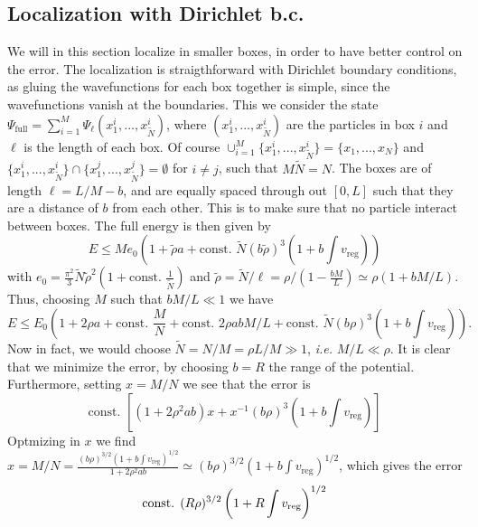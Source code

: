 \documentclass[a4paper,11pt]{article}
\newcommand{\ie}{\emph{i.e.} }
\numberwithin{equation}{section}
\begin{document}
	\subsection{Localization with Dirichlet b.c.}
	We will in this section localize in smaller boxes, in order to have better control on the error. The localization is straigthforward with Dirichlet boundary conditions, as gluing the wavefunctions for each box together is simple, since the wavefunctions vanish at the boundaries. This we consider the state $ \Psi_{\text{full}}=\sum_{i=1}^{M}\Psi_{\ell}(x^i_1,...,x^i_{\tilde{N}}) $, where $ (x_1^i,...,x_{\tilde{N}}^i) $ are the particles in box $ i $ and $ \ell $ is the length of each box. Of course $ \cup_{i=1}^{M}\{x_1^i,...,x_{\tilde{N}}^i\}=\{x_1,...,x_N\} $ and $ \{x_1^i,...,x_{\tilde{N}}^i\}\cap\{x_1^j,...,x_{\tilde{N}}^j\}=\emptyset $ for $ i\neq j $, such that $ M\tilde{N}=N $. The boxes are of length $ \ell=L/M-b $, and are equally spaced through out $ [0,L] $ such that they are a distance of $ b $ from each other. This is to make sure that no particle interact between boxes. The full energy is then given by \begin{equation}
	E\leq M e_0\left(1+\tilde{\rho} a + \text{const. } \tilde{N} (b\tilde{\rho})^3\left(1+b\int v_{\text{reg}}\right)\right)
	\end{equation}
	with $ e_0=\frac{\pi^2}{3}\tilde{N}\tilde{\rho}^2(1+\text{const. }\frac{1}{\tilde{N}}) $ and $ \tilde{\rho}=\tilde{N}/\ell=\rho/(1-\frac{bM}{L})\simeq\rho(1+bM/L) $.
	Thus, choosing $ M $ such that $ bM/L\ll 1 $ we have \begin{equation}
	E\leq E_0\left(1+2\rho a+\text{const. }\frac{M}{N}+\text{const. }2\rho abM/L+\text{const. }\tilde{N}(b\rho)^3\left(1+b\int v_{\text{reg}}\right)\right).
	\end{equation}
	Now in fact, we would choose $ \tilde{N}=N/M=\rho L/M\gg 1 $, \ie $ M/L\ll \rho $. It is clear that we minimize the error, by choosing $ b=R $ the range of the potential. Furthermore, setting $ x=M/N $ we see that the error is \begin{equation}
	\text{const. }\left[(1+2\rho^2 ab)x+x^{-1}(b\rho)^3\left(1+b\int v_{\text{reg}}\right)\right]
	\end{equation}
	Optmizing in $ x $ we find $ x=M/N=\frac{(b\rho)^{3/2}\left(1+b\int v_{\text{reg}}\right)^{1/2}}{1+2\rho^2 a b}\simeq(b\rho)^{3/2}\left(1+b\int v_{\text{reg}}\right)^{1/2} $, which gives the error \begin{equation}
	\text{const. }(R\rho)^{3/2}\left(1+R \int v_{\textnormal{reg}}\right)^{1/2}
	\end{equation}
\end{document}

